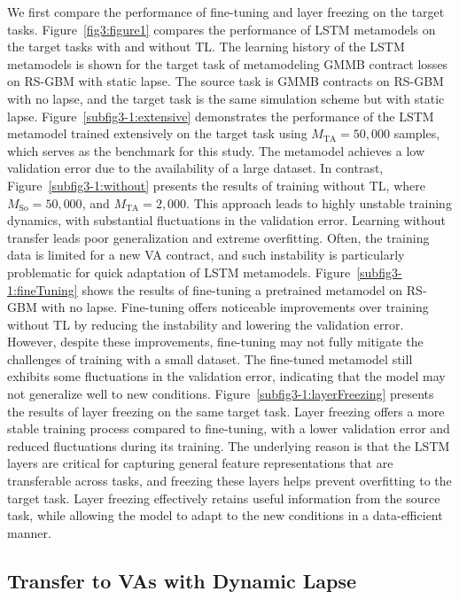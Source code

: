 We first compare the performance of fine-tuning and layer freezing on the target tasks.
Figure~\ref{fig3:figure1} compares the performance of LSTM metamodels on the target tasks with and without TL.
The learning history of the LSTM metamodels is shown for the target task of metamodeling GMMB contract losses on RS-GBM with static lapse.
The source task is GMMB contracts on RS-GBM with no lapse, and the target task is the same simulation scheme but with static lapse.
Figure~\ref{subfig3-1:extensive} demonstrates the performance of the LSTM metamodel trained extensively on the target task using $M_{\text{TA}} = 50,\!000$ samples, which serves as the benchmark for this study. 
The metamodel achieves a low validation error due to the availability of a large dataset.
In contrast, Figure~\ref{subfig3-1:without} presents the results of training without TL, where $M_{\text{So}} = 50,\!000$, and $M_{\text{TA}} = 2,\!000$.
This approach leads to highly unstable training dynamics, with substantial fluctuations in the validation error.
Learning without transfer leads poor generalization and extreme overfitting. 
Often, the training data is limited for a new VA contract, and such instability is particularly problematic for quick adaptation of LSTM metamodels.
Figure~\ref{subfig3-1:fineTuning} shows the results of fine-tuning a pretrained metamodel on RS-GBM with no lapse.
Fine-tuning offers noticeable improvements over training without TL by reducing the instability and lowering the validation error. 
However, despite these improvements, fine-tuning may not fully mitigate the challenges of training with a small dataset.
The fine-tuned metamodel still exhibits some fluctuations in the validation error, indicating that the model may not generalize well to new conditions.
Figure~\ref{subfig3-1:layerFreezing} presents the results of layer freezing on the same target task.
Layer freezing offers a more stable training process compared to fine-tuning, with a lower validation error and reduced fluctuations during its training.
The underlying reason is that the LSTM layers are critical for capturing general feature representations that are transferable across tasks, and freezing these layers helps prevent overfitting to the target task.
Layer freezing effectively retains useful information from the source task, while allowing the model to adapt to the new conditions in a data-efficient manner.

\subsection{Transfer to VAs with Dynamic Lapse}


